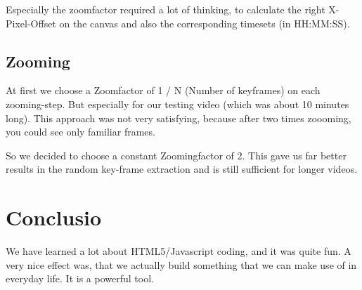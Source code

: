 \documentclass[11pt]{scrartcl}
\begin{document}
Especially the zoomfactor required a lot of thinking, to calculate the right X-Pixel-Offset on the canvas and also the corresponding timesets (in HH:MM:SS).

\subsection{Zooming}
At first we choose a Zoomfactor of 1 / N (Number of keyframes) on each zooming-step. But especially for our testing video (which was about 10 minutes long). This approach was not very satisfying, because after two times zoooming, you could see only familiar frames. 

So we decided to choose a constant Zoomingfactor of 2. This gave us far better results in the random key-frame extraction and is still sufficient for longer videos.

\section{Conclusio}

We have learned a lot about HTML5/Javascript coding, and it was quite fun. A very nice effect was, that we actually build something that we can make use of in everyday life. It is a powerful tool.
\end{document}
